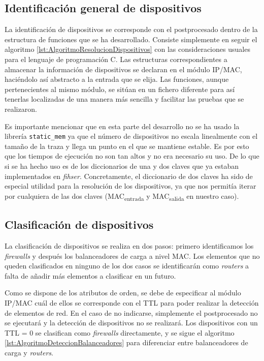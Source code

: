 \documentclass[twoside, 12pt]{epstfg}
\begin{document}
\subsection{Identificación general de dispositivos}
La identificación de dispositivos se corresponde con el postprocesado dentro de la estructura de funciones que se ha desarrollado. Consiste simplemente en seguir el algoritmo \ref{lst:AlgoritmoResolucionDispositivos} con las consideraciones usuales para el lenguaje de programación C. Las estructuras correspondientes a almacenar la información de dispositivos se declaran en el módulo IP/MAC, haciéndolo así abstracto a la entrada que se elija. Las funciones, aunque pertenecientes al mismo módulo, se sitúan en un fichero diferente para así tenerlas localizadas de una manera más sencilla y facilitar las pruebas que se realizaron.

Es importante mencionar que en esta parte del desarrollo no se ha usado la librería \texttt{static\_mem} ya que el número de dispositivos no escala linealmente con el tamaño de la traza y llega un punto en el que se mantiene estable. Es por esto que los tiempos de ejecución no son tan altos y no era necesario su uso. De lo que si se ha hecho uso es de los diccionarios de una y dos claves que ya estaban implementados en \textit{fihser}. Concretamente, el diccionario de dos claves ha sido de especial utilidad para la resolución de los dispositivos, ya que nos permitía iterar por cualquiera de las dos claves (MAC\textsubscript{entrada} y MAC\textsubscript{salida} en nuestro caso).

\subsection{Clasificación de dispositivos}
La clasificación de dispositivos se realiza en dos pasos: primero identificamos los \textit{firewalls} y después los balanceadores de carga a nivel MAC. Los elementos que no queden clasificados en ninguno de los dos casos se identificarán como \textit{routers} a falta de añadir más elementos a clasificar en un futuro.

Como se dispone de los atributos de orden, se debe de especificar al módulo IP/MAC cuál de ellos se corresponde con el TTL para poder realizar la detección de elementos de red. En el caso de no indicarse, simplemente el postprocesado no se ejecutará y la detección de dispositivos no se realizará. Los dispositivos con un TTL = 0 se clasifican como \textit{firewalls} directamente, y se sigue el algoritmo \ref{lst:AlgoritmoDeteccionBalanceadores} para diferenciar entre balanceadores de carga y \textit{routers}.
\end{document}
